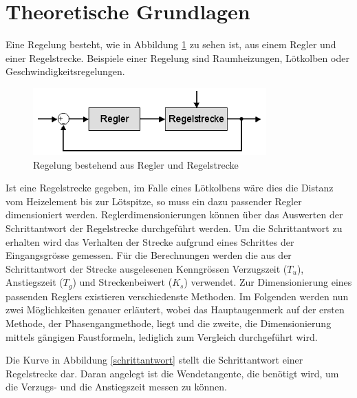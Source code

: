 \section{Theoretische Grundlagen}
Eine Regelung besteht, wie in Abbildung \ref{regelstrecke} zu sehen ist, aus einem Regler und einer Regelstrecke. Beispiele einer Regelung sind Raumheizungen, Lötkolben oder Geschwindigkeitsregelungen.\newline 

\begin{figure}[h]
\centering
\includegraphics[width=0.8\textwidth]{Regelstrecke.png}
\caption{Regelung bestehend aus Regler und Regelstrecke}
\label{regelstrecke}
\end{figure}


Ist eine Regelstrecke gegeben, im Falle eines Lötkolbens wäre dies die Distanz vom Heizelement bis zur Lötspitze, so muss ein dazu passender Regler dimensioniert werden. Reglerdimensionierungen können über das Auswerten der Schrittantwort der Regelstrecke durchgeführt werden. Um die Schrittantwort zu erhalten wird das Verhalten der Strecke aufgrund eines Schrittes der Eingangsgrösse gemessen. Für die Berechnungen werden die aus der Schrittantwort der Strecke ausgelesenen Kenngrössen Verzugszeit ($T_u$), Anstiegszeit ($T_g$) und Streckenbeiwert ($K_s$) verwendet. Zur Dimensionierung eines passenden Reglers existieren verschiedenste Methoden. Im Folgenden werden nun zwei Möglichkeiten genauer erläutert, wobei das Hauptaugenmerk auf der ersten Methode, der Phasengangmethode, liegt und die zweite, die Dimensionierung mittels gängigen Faustformeln, lediglich zum Vergleich durchgeführt wird.\newline

\newpage
Die Kurve in Abbildung \ref{schrittantwort} stellt die Schrittantwort einer Regelstrecke dar. Daran angelegt ist die Wendetangente, die benötigt wird, um die Verzugs- und die Anstiegszeit messen zu können.\newline

